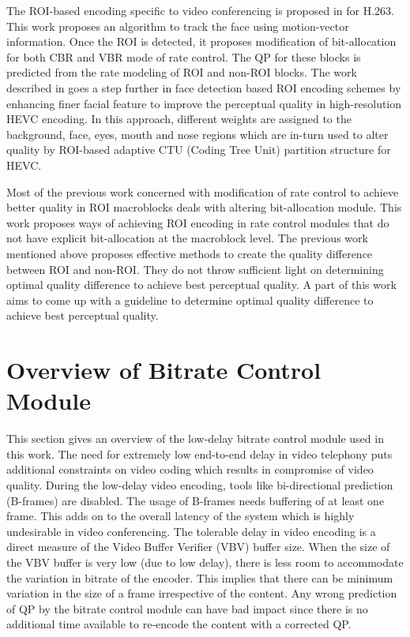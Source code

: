 \documentclass[11pt]{article} %
\begin{document}
The ROI-based encoding specific to video conferencing is proposed in \cite{ROI-MV-based-face-tracking} for H.263. This work proposes an algorithm to track the face using motion-vector information. Once the ROI is detected, it proposes modification of bit-allocation for both CBR and VBR mode of rate control. The QP for these blocks is predicted from the rate modeling of ROI and non-ROI blocks. The work described in \cite{Perception-model-of-face} goes a step further in face detection based ROI encoding schemes by enhancing finer facial feature to improve the perceptual quality in high-resolution HEVC encoding. In this approach, different weights are assigned to the background, face, eyes, mouth and nose regions which are in-turn used to alter quality by ROI-based adaptive CTU (Coding Tree Unit) partition structure for HEVC.

Most of the previous work concerned with modification of rate control to achieve better quality in ROI macroblocks deals with altering bit-allocation module. This work proposes ways of achieving ROI encoding in rate control modules that do not have explicit bit-allocation at the macroblock level. The previous work mentioned above proposes effective methods to create the quality difference between ROI and non-ROI. They do not throw sufficient light on determining optimal quality difference to achieve best perceptual quality. A part of this work aims to come up with a guideline to determine optimal quality difference to achieve best perceptual quality.
\clearpage
\section{Overview of Bitrate Control Module} \label{sec:used-bitrate-control-overview}
This section gives an overview of the low-delay bitrate control module used in this work. The need for extremely low end-to-end delay in video telephony puts additional constraints on video coding which results in compromise of video quality. During the low-delay video encoding, tools like bi-directional prediction (B-frames) are disabled. The usage of B-frames needs buffering of at least one frame. This adds on to the overall latency of the system which is highly undesirable in video conferencing. The tolerable delay in video encoding is a direct measure of the Video Buffer Verifier (VBV) buffer size. When the size of the VBV buffer is very low (due to low delay), there is less room to accommodate the variation in bitrate of the encoder. This implies that there can be minimum variation in the size of a frame irrespective of the content. Any wrong prediction of QP by the bitrate control module can have bad impact since there is no additional time available to re-encode the content with a corrected QP. 
 
\end{document}

